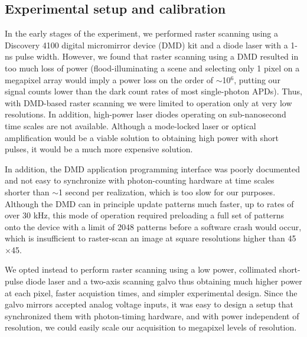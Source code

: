 \subsection{Experimental setup and calibration}

In the early stages of the experiment, we performed raster scanning using a Discovery 4100 digital micromirror device (DMD) kit and a diode laser with a 1-ns pulse width. However, we found that raster scanning using a DMD resulted in too much loss of power (flood-illuminating a scene and selecting only 1 pixel on a megapixel array would imply a power loss on the order of $\sim$10$^6$, putting our signal counts lower than the dark count rates of most single-photon APDs). Thus, with DMD-based raster scanning we were limited to operation only at very low resolutions. In addition, high-power laser diodes operating on sub-nanosecond time scales are not available. Although a mode-locked laser or optical amplification would be a viable solution to obtaining high power with short pulses, it would be a much more expensive solution.

In addition, the DMD application programming interface was poorly documented and not easy to synchronize with photon-counting hardware at time scales shorter than $\sim$1 second per realization, which is too slow for our purposes. Although the DMD can in principle update patterns much faster, up to rates of over 30 kHz, this mode of operation required preloading a full set of patterns onto the device with a limit of 2048 patterns before a software crash would occur, which is insufficient to raster-scan an image at square resolutions higher than 45$\times$45.

We opted instead to perform raster scanning using a low power, collimated short-pulse diode laser and a two-axis scanning galvo thus obtaining much higher power at each pixel, faster acquistion times, and simpler experimental design. Since the galvo mirrors accepted analog voltage inputs, it was easy to design a setup that synchronized them with photon-timing hardware, and with power independent of resolution, we could easily scale our acquisition to megapixel levels of resolution.

